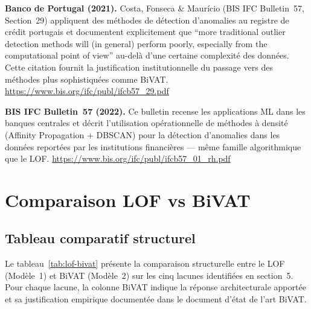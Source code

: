 \documentclass[12pt,a4paper]{article}
\begin{document}
\textbf{Banco de Portugal (2021).} Costa, Fonseca \& Maurício (BIS IFC
Bulletin~57, Section~29) appliquent des méthodes de détection d'anomalies
au registre de crédit portugais et documentent explicitement que ``more
traditional outlier detection methods will (in general) perform poorly,
especially from the computational point of view'' au-delà d'une certaine
complexité des données. Cette citation fournit la justification institutionnelle
du passage vers des méthodes plus sophistiquées comme BiVAT.
\url{https://www.bis.org/ifc/publ/ifcb57\_29.pdf}

\textbf{BIS IFC Bulletin~57 (2022).} Ce bulletin recense les applications ML
dans les banques centrales et décrit l'utilisation opérationnelle de méthodes
à densité (Affinity Propagation + DBSCAN) pour la détection d'anomalies dans
les données reportées par les institutions financières --- même famille
algorithmique que le LOF.
\url{https://www.bis.org/ifc/publ/ifcb57\_01\_rh.pdf}

\section{Comparaison LOF vs BiVAT}

\subsection{Tableau comparatif structurel}

Le tableau~\ref{tab:lof-bivat} présente la comparaison structurelle entre
le LOF (Modèle~1) et BiVAT (Modèle~2) sur les cinq lacunes identifiées en
section~5. Pour chaque lacune, la colonne BiVAT indique la réponse
architecturale apportée et sa justification empirique documentée dans le
document d'état de l'art BiVAT.
\end{document}
